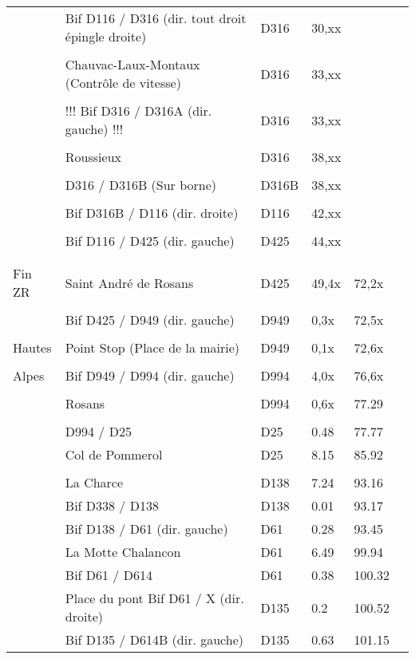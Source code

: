 \documentclass{article}%
\begin{document}
\begin{longtable}{p{2.25cm}|p{7.0cm}|p{1.5cm}|p{1.5cm}|p{1.5cm}|p{3.5cm}}
 &Bif D116 / D316 (dir. tout droit épingle droite)&D316&30,xx& & \\%
 & & & & & \\%
 &Chauvac-Laux-Montaux (Contrôle de vitesse)&D316&33,xx& & \\%
 & & & & & \\%
 &!!! Bif D316 / D316A (dir. gauche) !!!&D316&33,xx& & \\%
 & & & & & \\%
 &Roussieux &D316 &38,xx& & \\%
 & & & & & \\%
 &D316 / D316B (Sur borne)&D316B&38,xx& & \\%
 & & & & & \\%
 &Bif D316B / D116 (dir. droite)&D116&42,xx& & \\%
 & & & & & \\%
 &Bif D116 / D425 (dir. gauche)&D425&44,xx& & \\%
 & & & & & \\%
\hline& & & & & \\%
Fin ZR &Saint André de Rosans &D425&49,4x&72,2x& \\%
 & & & & & \\%
 &Bif D425 / D949 (dir. gauche)&D949&0,3x&72,5x& \\%
 & & & & & \\%
Hautes &Point Stop (Place de la mairie) &D949&0,1x&72,6x& \\%
 & & & & & \\%
Alpes&Bif D949 / D994 (dir. gauche)&D994&4,0x&76,6x& \\%
 & & & & & \\%
 &Rosans&D994&0,6x&77.29& \\%
 & & & & & \\%
 &D994 / D25&D25&0.48&77.77& \\%
 &Col de Pommerol&D25&8.15&85.92& \\%
\hline& & & & & \\%
 &La Charce&D138&7.24&93.16& \\%
 &Bif D338 / D138&D138&0.01&93.17& \\%
 &Bif D138 / D61 (dir. gauche)&D61&0.28&93.45& \\%
 &La Motte Chalancon&D61&6.49&99.94& \\%
 &Bif D61 / D614&D61&0.38&100.32& \\%
 &Place du pont Bif D61 / X (dir. droite) &D135&0.2&100.52& \\%
 &Bif D135 / D614B (dir. gauche)&D135&0.63&101.15& \\%

\end{longtable}
\end{document}
